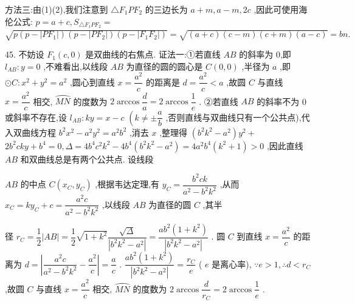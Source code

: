 方法三:由(1)(2),我们注意到 $\bigtriangleup {F}_{1}P{F}_{2}$ 的三边长为 $a + m,a - m,{2c}$ ,因此可使用海伦公式: $p = a + c,{S}_{\bigtriangleup {F}_{1}P{F}_{2}} =$  $\sqrt{p\left( {p - \left| {P{F}_{1}}\right| }\right) \left( {p - \left| {P{F}_{2}}\right| }\right) \left( {p - \left| {{F}_{1}{F}_{2}}\right| }\right) } = \sqrt{\left( {a + c}\right) \left( {c - m}\right) \left( {c + m}\right) \left( {a - c}\right) } = {bn}.$

45. 不妨设 ${F}_{1}\left( {c,0}\right)$ 是双曲线的右焦点. 证法一:①若直线 ${AB}$ 的斜率为 0,即 ${l}_{AB} : y = 0$ ,不难看出,以线段 ${AB}$ 为直径的圆的圆心是 $C\left( {0,0}\right)$ ,半径为 $a$ ,即 $\odot  C : {x}^{2} + {y}^{2} = {a}^{2}$ ,圆心到直线 $x = \dfrac{{a}^{2}}{c}$ 的距离是 $d = \dfrac{{a}^{2}}{c} < a$ ,故圆 $C$ 与直线 $x = \dfrac{{a}^{2}}{c}$ 相交, $\overset{⏜}{MN}$ 的度数为 $2\arccos \dfrac{d}{a} = 2\arccos \dfrac{1}{e}$ . ②若直线 ${AB}$ 的斜率不为 0 或斜率不存在,设 ${l}_{AB} : {ky} = x - c$  $\left( {k \neq   \pm  \dfrac{a}{b}}\right.$ ,否则直线与双曲线只有一个公共点),代入双曲线方程 ${b}^{2}{x}^{2} - {a}^{2}{y}^{2} = {a}^{2}{b}^{2}$ ,消去 $x$ ,整理得 $\left( {{b}^{2}{k}^{2} - {a}^{2}}\right) {y}^{2} +$  $2{b}^{2}{cky} + {b}^{4} = 0,\Delta  = 4{b}^{4}{c}^{2}{k}^{2} - 4{b}^{4}\left( {{b}^{2}{k}^{2} - {a}^{2}}\right)  = 4{a}^{2}{b}^{4}\left( {{k}^{2} + 1}\right)  > 0$ ,因此直线 ${AB}$ 和双曲线总是有两个公共点. 设线段

${AB}$ 的中点 $C\left( {{x}_{C},{y}_{C}}\right)$ ,根据韦达定理,有 ${y}_{C} = \dfrac{{b}^{2}{ck}}{{a}^{2} - {b}^{2}{k}^{2}}$ ,从而 ${x}_{C} = k{y}_{C} + c = \dfrac{{a}^{2}c}{{a}^{2} - {b}^{2}{k}^{2}}$ ,以线段 ${AB}$ 为直径的圆 $C$ ,其半

径 ${r}_{C} = \dfrac{1}{2}\left| {AB}\right|  = \dfrac{1}{2}\sqrt{1 + {k}^{2}}\dfrac{\sqrt{\Delta }}{\left| {b}^{2}{k}^{2} - {a}^{2}\right| } = \dfrac{a{b}^{2}\left( {1 + {k}^{2}}\right) }{\left| {b}^{2}{k}^{2} - {a}^{2}\right| }$ . 圆 $C$ 到直线 $x = \dfrac{{a}^{2}}{c}$ 的距离为 $d = \left| {\dfrac{{a}^{2}c}{{a}^{2} - {b}^{2}{k}^{2}} - \dfrac{{a}^{2}}{c}}\right|  = \dfrac{a}{c}$ . $\dfrac{a{b}^{2}\left( {1 + {k}^{2}}\right) }{\left| {b}^{2}{k}^{2} - {a}^{2}\right| } = \dfrac{{r}_{C}}{e}$ ( $e$ 是离心率), $\because e > 1,\therefore d < {r}_{C}$ ,故圆 $C$ 与直线 $x = \dfrac{{a}^{2}}{c}$ 相交, $\overset{⏜}{MN}$ 的度数为 $2\arccos \dfrac{d}{{r}_{C}} = 2\arccos \dfrac{1}{e}$ .

